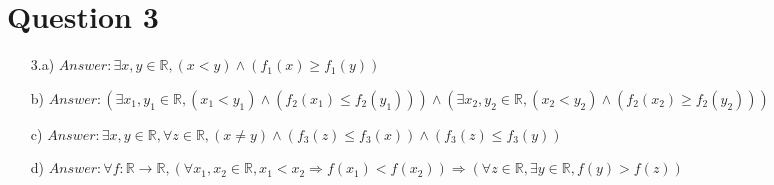 \documentclass[20pt]{article}
\begin{document}
\newpage

\section*{Question 3}

\begin{enumerate}
\item[3.a)] $Answer: \exists x, y \in \mathbb{R}, (x < y) \land (f_1(x) \geq f_1(y))$

\item[b)] $Answer: (\exists x_1, y_1 \in \mathbb{R}, (x_1 < y_1) \land (f_2(x_1) \leq f_2(y_1))) \wedge (\exists x_2, y_2 \in \mathbb{R}, (x_2 < y_2) \wedge (f_2(x_2) \geq f_2(y_2)))$

\item[c)] $Answer: \exists x, y  \in \mathbb{R}, \forall z \in \mathbb{R}, (x \neq y) \wedge (f_3(z) \leq f_3(x))  \wedge (f_3(z) \leq f_3(y))$

\item[d)] $Answer: \forall f: \mathbb{R} \rightarrow \mathbb{R}, (\forall x_1, x_2 \in \mathbb{R}, x_1 < x_2 \Rightarrow f(x_1) < f(x_2)) \Rightarrow (\forall z \in \mathbb{R}, \exists y \in \mathbb{R}, f(y) > f(z))$

\end{enumerate}
\newpage
\end{document}
